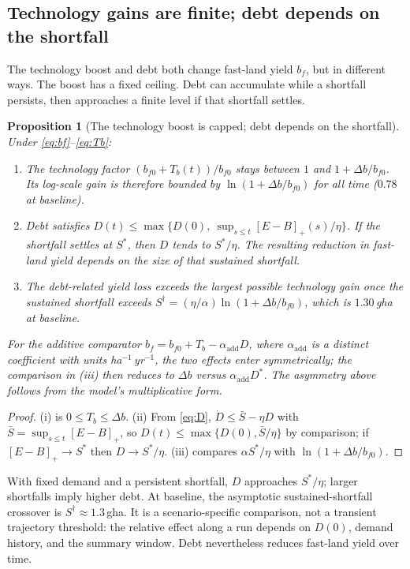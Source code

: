 \documentclass[preprint,12pt,authoryear]{elsarticle}
\newtheorem{proposition}{Proposition}
\newcommand{\pos}[1]{\left[#1\right]_+}
\begin{document}
\subsection{Technology gains are finite; debt depends on the shortfall}\label{sec:bounded}

The technology boost and debt both change fast-land yield $b_f$, but in different ways. The boost has a fixed ceiling. Debt can accumulate while a shortfall persists, then approaches a finite level if that shortfall settles.

\begin{proposition}[The technology boost is capped; debt depends on the shortfall]\label{prop:bounded}
Under \eqref{eq:bf}--\eqref{eq:Tb}:
\begin{enumerate}[label=(\roman*)]
\item The technology factor $(b_{f0}+T_b(t))/b_{f0}$ stays between $1$ and $1+\Delta b/b_{f0}$. Its log-scale gain is therefore bounded by $\ln(1+\Delta b/b_{f0})$ for all time ($0.78$ at baseline).
\item Debt satisfies $D(t)\le\max\{D(0),\ \sup_{s\le t}\pos{E-B}(s)/\eta\}$. If the shortfall settles at $S^*$, then $D$ tends to $S^*/\eta$. The resulting reduction in fast-land yield depends on the size of that sustained shortfall.
\item The debt-related yield loss exceeds the largest possible technology gain once the sustained shortfall exceeds $S^\dagger=(\eta/\alpha)\ln(1+\Delta b/b_{f0})$, which is $1.30$\,gha at baseline.
\end{enumerate}
For the additive comparator $b_f=b_{f0}+T_b-\alpha_{\mathrm{add}}D$, where $\alpha_{\mathrm{add}}$ is a distinct coefficient with units ha$^{-1}$\,yr$^{-1}$, the two effects enter symmetrically; the comparison in (iii) then reduces to $\Delta b$ versus $\alpha_{\mathrm{add}}D^*$. The asymmetry above follows from the model's multiplicative form.
\end{proposition}

\begin{proof}
(i) is $0\le T_b\le\Delta b$. (ii) From \eqref{eq:D}, $\dot D\le\bar S-\eta D$ with $\bar S=\sup_{s\le t}\pos{E-B}$, so $D(t)\le\max\{D(0),\bar S/\eta\}$ by comparison; if $\pos{E-B}\to S^*$ then $D\to S^*/\eta$. (iii) compares $\alpha S^*/\eta$ with $\ln(1+\Delta b/b_{f0})$.
\end{proof}

With fixed demand and a persistent shortfall, $D$ approaches $S^*/\eta$; larger shortfalls imply higher debt. At baseline, the asymptotic sustained-shortfall crossover is $S^\dagger\approx1.3$\,gha. It is a scenario-specific comparison, not a transient trajectory threshold: the relative effect along a run depends on $D(0)$, demand history, and the summary window. Debt nevertheless reduces fast-land yield over time.
\end{document}
